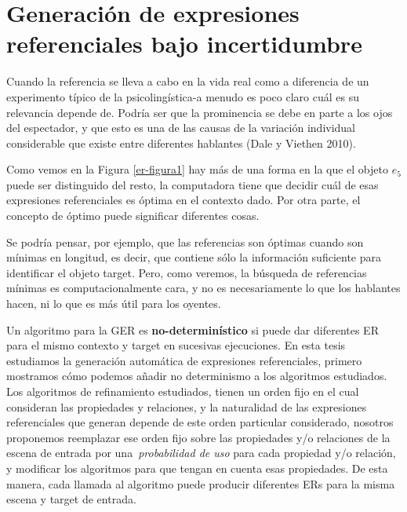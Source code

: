 \section{Generaci\'on de expresiones referenciales bajo incertidumbre}
\label{sec:gre-incertidumbre}


Cuando la referencia se lleva a cabo en la vida real como
a diferencia de un experimento t\'ipico de la psicoling\'istica-a menudo es poco claro cu\'al es su relevancia
depende de. Podr\'ia ser que la prominencia se debe en parte a los ojos del espectador, y que esto es
una de las causas de la variaci\'on individual considerable que existe entre diferentes
hablantes (Dale y Viethen 2010).



Como vemos en la Figura \ref{er-figura1} hay m\'as de una forma en la que el objeto $e_5$ puede ser distinguido del resto, la computadora tiene que decidir cu\'al de esas expresiones referenciales es \'optima en el contexto dado. Por otra parte, el concepto de \'optimo puede significar diferentes cosas.

Se podr\'{i}a pensar, por ejemplo, que las referencias son \'optimas cuando son m\'{i}nimas en longitud, es decir, 
que contiene s\'olo la informaci\'on suficiente para identificar el objeto target. Pero, como veremos, la b\'usqueda de referencias m\'{i}nimas
es computacionalmente cara, y no es necesariamente lo que los hablantes hacen, ni lo que es m\'as \'util para los oyentes.

Un algoritmo para la GER es {\bf no-determin\'istico} si puede dar diferentes ER para el mismo contexto y target en sucesivas ejecuciones.
En esta tesis estudiamos la generaci\'on autom\'atica de expresiones referenciales, 
primero mostramos c\'omo podemos a\~nadir no determinismo a los algoritmos estudiados. Los algoritmos de refinamiento estudiados, tienen un orden fijo en el cual consideran las propiedades y relaciones, y la naturalidad de las expresiones referenciales que generan depende de este orden particular considerado, nosotros proponemos reemplazar ese orden fijo sobre las propiedades y/o relaciones de la escena de entrada por una~\emph{probabilidad de uso} para cada propiedad y/o relaci\'on, y modificar los algoritmos para que tengan en cuenta esas propiedades. De esta manera, cada llamada al algoritmo puede producir diferentes ERs para la misma escena y target de entrada. 

